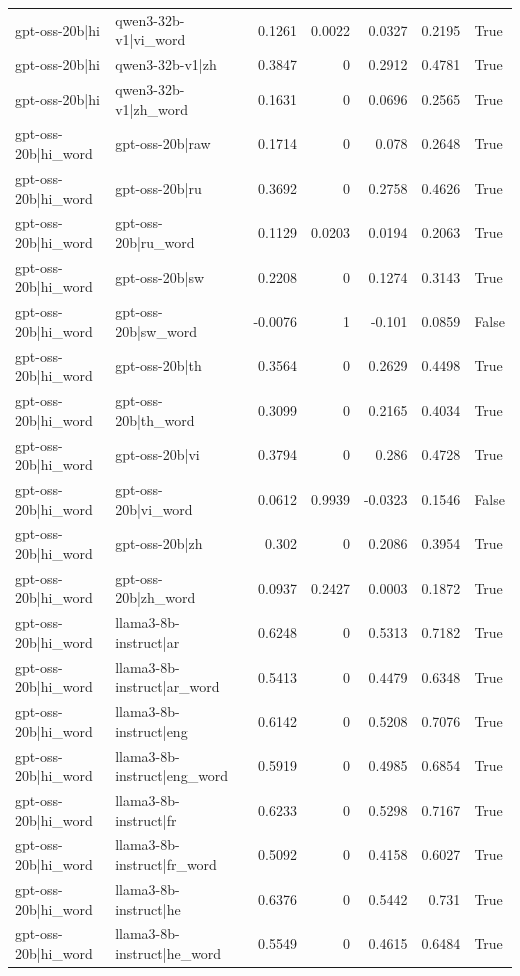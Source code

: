 \begin{table}
\begin{tabular}{l l r r r r l}
gpt-oss-20b|hi & qwen3-32b-v1|vi_word & 0.1261 & 0.0022 & 0.0327 & 0.2195 & True \\
gpt-oss-20b|hi & qwen3-32b-v1|zh & 0.3847 & 0 & 0.2912 & 0.4781 & True \\
gpt-oss-20b|hi & qwen3-32b-v1|zh_word & 0.1631 & 0 & 0.0696 & 0.2565 & True \\
gpt-oss-20b|hi_word & gpt-oss-20b|raw & 0.1714 & 0 & 0.078 & 0.2648 & True \\
gpt-oss-20b|hi_word & gpt-oss-20b|ru & 0.3692 & 0 & 0.2758 & 0.4626 & True \\
gpt-oss-20b|hi_word & gpt-oss-20b|ru_word & 0.1129 & 0.0203 & 0.0194 & 0.2063 & True \\
gpt-oss-20b|hi_word & gpt-oss-20b|sw & 0.2208 & 0 & 0.1274 & 0.3143 & True \\
gpt-oss-20b|hi_word & gpt-oss-20b|sw_word & -0.0076 & 1 & -0.101 & 0.0859 & False \\
gpt-oss-20b|hi_word & gpt-oss-20b|th & 0.3564 & 0 & 0.2629 & 0.4498 & True \\
gpt-oss-20b|hi_word & gpt-oss-20b|th_word & 0.3099 & 0 & 0.2165 & 0.4034 & True \\
gpt-oss-20b|hi_word & gpt-oss-20b|vi & 0.3794 & 0 & 0.286 & 0.4728 & True \\
gpt-oss-20b|hi_word & gpt-oss-20b|vi_word & 0.0612 & 0.9939 & -0.0323 & 0.1546 & False \\
gpt-oss-20b|hi_word & gpt-oss-20b|zh & 0.302 & 0 & 0.2086 & 0.3954 & True \\
gpt-oss-20b|hi_word & gpt-oss-20b|zh_word & 0.0937 & 0.2427 & 0.0003 & 0.1872 & True \\
gpt-oss-20b|hi_word & llama3-8b-instruct|ar & 0.6248 & 0 & 0.5313 & 0.7182 & True \\
gpt-oss-20b|hi_word & llama3-8b-instruct|ar_word & 0.5413 & 0 & 0.4479 & 0.6348 & True \\
gpt-oss-20b|hi_word & llama3-8b-instruct|eng & 0.6142 & 0 & 0.5208 & 0.7076 & True \\
gpt-oss-20b|hi_word & llama3-8b-instruct|eng_word & 0.5919 & 0 & 0.4985 & 0.6854 & True \\
gpt-oss-20b|hi_word & llama3-8b-instruct|fr & 0.6233 & 0 & 0.5298 & 0.7167 & True \\
gpt-oss-20b|hi_word & llama3-8b-instruct|fr_word & 0.5092 & 0 & 0.4158 & 0.6027 & True \\
gpt-oss-20b|hi_word & llama3-8b-instruct|he & 0.6376 & 0 & 0.5442 & 0.731 & True \\
gpt-oss-20b|hi_word & llama3-8b-instruct|he_word & 0.5549 & 0 & 0.4615 & 0.6484 & True \\

\end{tabular}
\end{table}
